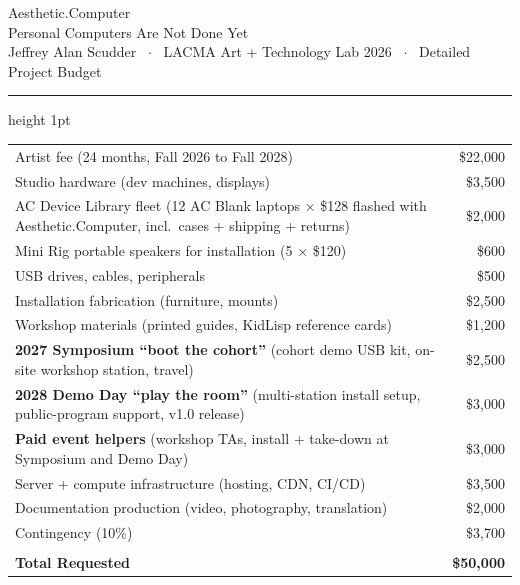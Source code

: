 \documentclass[12pt,letterpaper]{article}
\begin{document}
\thispagestyle{empty}

\vspace*{0.2em}
\begin{center}
  {\acbold\fontsize{26pt}{30pt}\selectfont Aesthetic{\color{acpink}.}Computer}\\[10pt]
  {\large Personal Computers Are Not Done Yet}\\[18pt]
  {\color{acgray}\small Jeffrey Alan Scudder \ $\cdot$ \ LACMA Art + Technology Lab 2026 \ $\cdot$ \ Detailed Project Budget}
\end{center}

\vspace{1em}
{\color{acpink}\hrule height 1pt}
\vspace{1.4em}

\renewcommand{\arraystretch}{1.35}
\begin{tabularx}{\textwidth}{@{}Xr@{}}
  Artist fee (24 months, Fall 2026 to Fall 2028) & \$22,000 \\
  Studio hardware (dev machines, displays) & \$3,500 \\
  AC Device Library fleet (12 AC Blank laptops × \$128 flashed with Aesthetic.Computer, incl.\ cases + shipping + returns) & \$2,000 \\
  Mini Rig portable speakers for installation (5 × \$120) & \$600 \\
  USB drives, cables, peripherals & \$500 \\
  Installation fabrication (furniture, mounts) & \$2,500 \\
  Workshop materials (printed guides, KidLisp reference cards) & \$1,200 \\
  \textbf{2027 Symposium ``boot the cohort''} (cohort demo USB kit, on-site workshop station, travel) & \$2,500 \\
  \textbf{2028 Demo Day ``play the room''} (multi-station install setup, public-program support, v1.0 release) & \$3,000 \\
  \textbf{Paid event helpers} (workshop TAs, install + take-down at Symposium and Demo Day) & \$3,000 \\
  Server + compute infrastructure (hosting, CDN, CI/CD) & \$3,500 \\
  Documentation production (video, photography, translation) & \$2,000 \\
  Contingency (10\%) & \$3,700 \\
  {\color{acgray}\hrulefill} & {\color{acgray}\hrulefill} \\[-0.3em]
  \textbf{Total Requested} & \textbf{\$50,000} \\
\end{tabularx}
\renewcommand{\arraystretch}{1.0}
\end{document}
